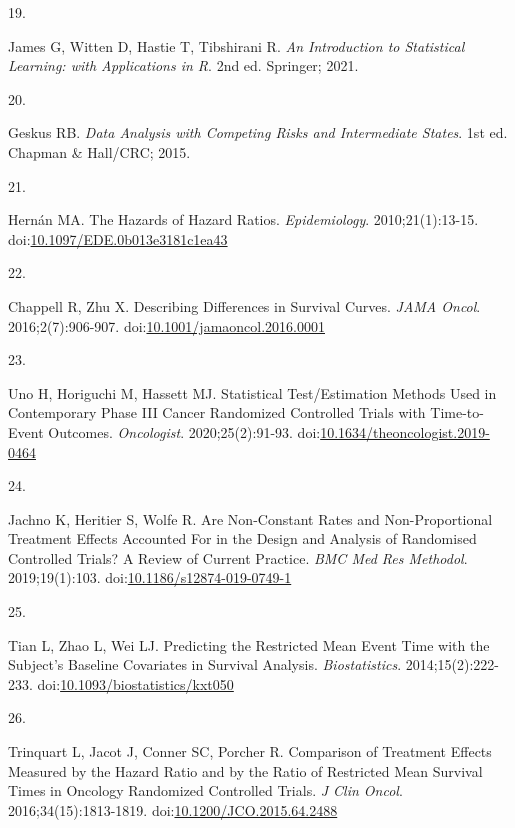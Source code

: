 \documentclass[
  12pt,
  number]{elsarticle}
\newlength{\cslhangindent}
\newlength{\csllabelwidth}
\newenvironment{CSLReferences}[2] %
 {\begin{list}{}{%
  \setlength{\itemindent}{0pt}
  \setlength{\leftmargin}{0pt}
  \setlength{\parsep}{0pt}
  \ifodd #1
   \setlength{\leftmargin}{\cslhangindent}
   \setlength{\itemindent}{-1\cslhangindent}
  \fi
  \setlength{\itemsep}{#2\baselineskip}}}
 {\end{list}}
\newcommand{\CSLLeftMargin}[1]{\parbox[t]{\csllabelwidth}{\strut#1\strut}}
\newcommand{\CSLRightInline}[1]{\parbox[t]{\linewidth - \csllabelwidth}{\strut#1\strut}}
\begin{document}
\begin{CSLReferences}{0}{1}
\CSLLeftMargin{19. }%
\CSLRightInline{James G, Witten D, Hastie T, Tibshirani R. \emph{{An
Introduction to Statistical Learning: with Applications in R}}. 2nd ed.
Springer; 2021.}

\CSLLeftMargin{20. }%
\CSLRightInline{Geskus RB. \emph{Data Analysis with Competing Risks and
Intermediate States}. 1st ed. Chapman \& Hall/CRC; 2015.}

\CSLLeftMargin{21. }%
\CSLRightInline{Hernán MA. {The Hazards of Hazard Ratios}.
\emph{Epidemiology}. 2010;21(1):13-15.
doi:\href{https://doi.org/10.1097/EDE.0b013e3181c1ea43}{10.1097/EDE.0b013e3181c1ea43}}

\CSLLeftMargin{22. }%
\CSLRightInline{Chappell R, Zhu X. {Describing Differences in Survival
Curves}. \emph{JAMA Oncol}. 2016;2(7):906-907.
doi:\href{https://doi.org/10.1001/jamaoncol.2016.0001}{10.1001/jamaoncol.2016.0001}}

\CSLLeftMargin{23. }%
\CSLRightInline{Uno H, Horiguchi M, Hassett MJ. {Statistical
Test/Estimation Methods Used in Contemporary Phase III Cancer Randomized
Controlled Trials with Time-to-Event Outcomes}. \emph{Oncologist}.
2020;25(2):91-93.
doi:\href{https://doi.org/10.1634/theoncologist.2019-0464}{10.1634/theoncologist.2019-0464}}

\CSLLeftMargin{24. }%
\CSLRightInline{Jachno K, Heritier S, Wolfe R. {Are Non-Constant Rates
and Non-Proportional Treatment Effects Accounted For in the Design and
Analysis of Randomised Controlled Trials? A Review of Current Practice}.
\emph{{BMC Med Res Methodol}}. 2019;19(1):103.
doi:\href{https://doi.org/10.1186/s12874-019-0749-1}{10.1186/s12874-019-0749-1}}

\CSLLeftMargin{25. }%
\CSLRightInline{Tian L, Zhao L, Wei LJ. {Predicting the Restricted Mean
Event Time with the Subject's Baseline Covariates in Survival Analysis}.
\emph{Biostatistics}. 2014;15(2):222-233.
doi:\href{https://doi.org/10.1093/biostatistics/kxt050}{10.1093/biostatistics/kxt050}}

\CSLLeftMargin{26. }%
\CSLRightInline{Trinquart L, Jacot J, Conner SC, Porcher R. {Comparison
of Treatment Effects Measured by the Hazard Ratio and by the Ratio of
Restricted Mean Survival Times in Oncology Randomized Controlled
Trials}. \emph{{J Clin Oncol}}. 2016;34(15):1813-1819.
doi:\href{https://doi.org/10.1200/JCO.2015.64.2488}{10.1200/JCO.2015.64.2488}}


\end{CSLReferences}
\end{document}
